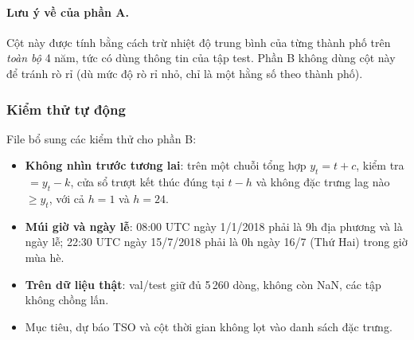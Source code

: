 \paragraph{Lưu ý về  của phần A.} Cột này được tính bằng cách trừ nhiệt độ trung bình
của từng thành phố trên \emph{toàn bộ} 4 năm, tức có dùng thông tin của tập test. Phần B không dùng cột này để
tránh rò rỉ (dù mức độ rò rỉ nhỏ, chỉ là một hằng số theo thành phố).

\subsubsection{Kiểm thử tự động}\label{sec:feat-tests}

File  bổ sung các kiểm thử cho phần B:
\begin{itemize}
  \item \textbf{Không nhìn trước tương lai}: trên một chuỗi tổng hợp $y_t = t + c$, kiểm tra
        $\,= y_t - k$, cửa sổ trượt kết thúc đúng tại $t-h$ và không đặc trưng lag nào
        $\geq y_t$, với cả $h=1$ và $h=24$.
  \item \textbf{Múi giờ và ngày lễ}: 08:00 UTC ngày 1/1/2018 phải là 9h địa phương và là ngày lễ;
        22:30 UTC ngày 15/7/2018 phải là 0h ngày 16/7 (Thứ Hai) trong giờ mùa hè.
  \item \textbf{Trên dữ liệu thật}: val/test giữ đủ 5\,260 dòng, không còn NaN, các tập không chồng lấn.
  \item Mục tiêu, dự báo TSO và cột thời gian không lọt vào danh sách đặc trưng.
\end{itemize}


